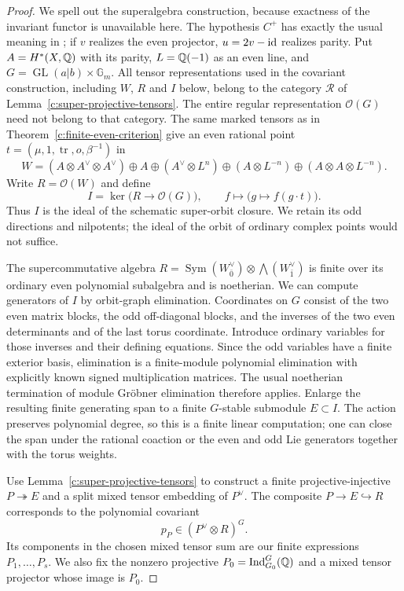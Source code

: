 \begin{proof}
We spell out the superalgebra construction, because exactness of
the invariant functor is unavailable here.  The hypothesis $C^+$
has exactly the usual meaning in
\citet[section~1, p.~1389]{c_tabuada2018sign}; if $v$ realizes the
even projector, $u=2v-\operatorname{id}$ realizes parity.
Put $A=H^*(X,\mathbb Q)$ with its parity, $L=\mathbb Q(-1)$ as an even line,
and $G=\operatorname{GL}(a|b)\times\mathbb G_m$.
All tensor representations used in the covariant construction,
including $W$, $R$ and $I$ below, belong to the category $\mathcal R$
of Lemma~\ref{c:super-projective-tensors}.  The entire regular
representation $\mathcal O(G)$ need not belong to that category.
The same marked tensors as in
Theorem~\ref{c:finite-even-criterion} give an even rational point
$t=(\mu,1,\operatorname{tr},o,\beta^{-1})$ in
\[
 W=(A\otimes A^\vee\otimes A^\vee)\oplus A
   \oplus(A^\vee\otimes L^n)
   \oplus(A\otimes L^{-n})
   \oplus(A\otimes A\otimes L^{-n}).
\]
Write $R=\mathcal O(W)$ and define
\[
 I=\ker\bigl(R\longrightarrow\mathcal O(G)\bigr),
 \qquad f\longmapsto\bigl(g\longmapsto f(g\cdot t)\bigr).
\]
Thus $I$ is the ideal of the schematic super-orbit closure.  We
retain its odd directions and nilpotents; the ideal of the orbit
of ordinary complex points would not suffice.

The supercommutative algebra
$R=\operatorname{Sym}(W_{\bar0}^\vee)\otimes
\bigwedge(W_{\bar1}^\vee)$ is finite over its ordinary even
polynomial subalgebra and is noetherian.  We can compute generators
of $I$ by orbit-graph elimination.  Coordinates on $G$ consist of
the two even matrix blocks, the odd off-diagonal blocks, and the
inverses of the two even determinants and of the last torus
coordinate.  Introduce ordinary variables for those inverses and
their defining equations.  Since the odd variables have a finite
exterior basis, elimination is a finite-module polynomial
elimination with explicitly known signed multiplication matrices.
The usual noetherian termination of module Gr\"obner elimination
therefore applies.  Enlarge the resulting finite generating span
to a finite $G$-stable submodule $E\subset I$.  The action preserves
polynomial degree, so this is a finite linear computation; one can
close the span under the rational coaction or the even and odd Lie
generators together with the torus weights.

Use Lemma~\ref{c:super-projective-tensors} to construct a finite
projective-injective $P\twoheadrightarrow E$ and a split mixed
tensor embedding of $P^\vee$.  The composite $P\to E\hookrightarrow R$
corresponds to the polynomial covariant
\[
 p_P\in(P^\vee\otimes R)^G.
\]
Its components in the chosen mixed tensor sum are our finite
expressions $P_1,\ldots,P_s$.  We also fix the nonzero projective
$P_0=\operatorname{Ind}_{G_0}^{G}(\mathbb Q)$ and a mixed tensor projector
whose image is $P_0$.


\end{proof}
